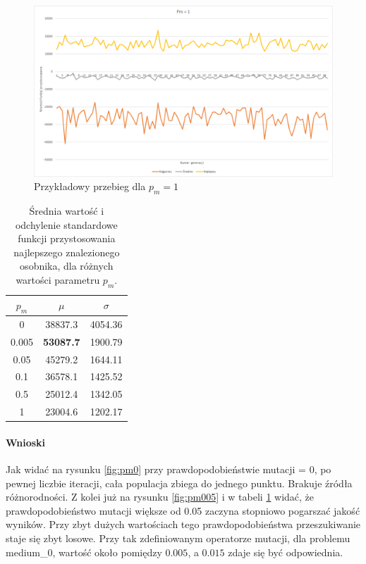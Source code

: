 \documentclass{article}
\begin{document}
	\begin{figure}[H]
		\centering
		\includegraphics[width=1\linewidth]{pm1.png}
		\caption{Przykładowy przebieg dla $p_m=1$}
		\label{fig:pm1}
	\end{figure}
	
	\begin{table}[H]
		\begin{center}
			\begin{tabular}{ |c|c|c| } 
				\hline
				$p_m$ & $\mu$ & $\sigma$ \\ 
				\hline
				0 & 38837.3 & 4054.36 \\ 
				0.005 & \textbf{53087.7} & 1900.79 \\ 
				0.05 & 45279.2 & 1644.11 \\ 
				0.1 & 36578.1 & 1425.52 \\ 
				0.5 & 25012.4 & 1342.05 \\ 
				1 & 23004.6 & 1202.17 \\ 
				\hline
			\end{tabular}
			\caption{Średnia wartość i odchylenie standardowe funkcji przystosowania najlepszego znalezionego osobnika, dla różnych wartości parametru $p_m$.}
			\label{tab:mut}
		\end{center}
	\end{table}
	
	\paragraph{Wnioski}
	Jak widać na rysunku \ref{fig:pm0} przy prawdopodobieństwie mutacji = 0, po pewnej liczbie iteracji, cała populacja zbiega do jednego punktu. Brakuje źródła różnorodności. Z kolei już na rysunku \ref{fig:pm005} i w tabeli \ref{tab:mut} widać, że prawdopodobieństwo mutacji większe od 0.05 zaczyna stopniowo pogarszać jakość wyników. Przy zbyt dużych wartościach tego prawdopodobieństwa przeszukiwanie staje się zbyt losowe. Przy tak zdefiniowanym operatorze mutacji, dla problemu medium\_0, wartość około pomiędzy $0.005$, a $0.015$ zdaje się być odpowiednia.
	\newpage
\end{document}
